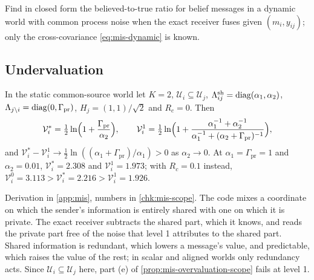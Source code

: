 \begin{openproblem}\label{open:mis-dynamic-ratio}
Find in closed form the believed-to-true ratio for belief messages in a dynamic world with common process noise when the exact receiver fuses given $(m_i,y_{ij})$; only the cross-covariance \eqref{eq:mis-dynamic} is known.
\end{openproblem}

\subsection{Undervaluation}\label{sup:mis-undervaluation}

\begin{example}\label{ex:mis-cancellation}
In the static common-source world let $K=2$, $\mathcal U_i\subseteq\mathcal U_j$, $\Lambda^{\mathrm{sh}}_{ij}=\operatorname{diag}(\alpha_1,\alpha_2)$, $\Lambda_{j\setminus i}=\operatorname{diag}(0,\Gamma_{\mathrm{pr}})$, $H_j=(1,1)/\sqrt2$ and $R_c=0$. Then
\begin{equation}\label{eq:mis-cancellation}
\mathcal V^\ast_i=\tfrac12\ln\Bigl(1+\frac{\Gamma_{\mathrm{pr}}}{\alpha_2}\Bigr),\qquad\mathcal V^1_i=\tfrac12\ln\Bigl(1+\frac{\alpha_1^{-1}+\alpha_2^{-1}}{\alpha_1^{-1}+(\alpha_2+\Gamma_{\mathrm{pr}})^{-1}}\Bigr),
\end{equation}
and $\mathcal V^\ast_i-\mathcal V^1_i\to\tfrac12\ln((\alpha_1+\Gamma_{\mathrm{pr}})/\alpha_1)>0$ as $\alpha_2\to0$. At $\alpha_1=\Gamma_{\mathrm{pr}}=1$ and $\alpha_2=0.01$, $\mathcal V^\ast_i=2.308$ and $\mathcal V^1_i=1.973$; with $R_c=0.1$ instead, $\mathcal V^0_i=3.113>\mathcal V^\ast_i=2.216>\mathcal V^1_i=1.926$.
\end{example}

Derivation in \cref{app:mis}, numbers in \cref{chk:mis-scope}. The code mixes a coordinate on which the sender's information is entirely shared with one on which it is private. The exact receiver subtracts the shared part, which it knows, and reads the private part free of the noise that level 1 attributes to the shared part. Shared information is redundant, which lowers a message's value, and predictable, which raises the value of the rest; in scalar and aligned worlds only redundancy acts. Since $\mathcal U_i\subseteq\mathcal U_j$ here, part (e) of \cref{prop:mis-overvaluation-scope} fails at level 1.

